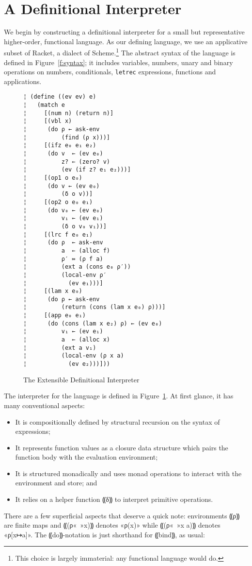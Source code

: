 \section{A Definitional Interpreter}\label{s:interp}

We begin by constructing a definitional interpreter for a small but
representative higher-order, functional language.  As our defining language, we
use an applicative subset of Racket, a dialect of Scheme.\footnote{This choice
is largely immaterial: any functional language would do.} The abstract syntax
of the language is defined in Figure~\ref{f:syntax}; it includes variables,
numbers, unary and binary operations on numbers, conditionals, {\tt letrec}
expressions, functions and applications.

\begin{figure}
\begin{lstlisting}
¦ (define ((ev ev) e)
¦   (match e
¦     [(num n) (return n)]
¦     [(vbl x)
¦      (do ρ ← ask-env
¦          (find (ρ x)))]    
¦     [(ifz e₀ e₁ e₂) 
¦      (do v  ← (ev e₀)
¦          z? ← (zero? v)
¦          (ev (if z? e₁ e₂)))]
¦     [(op1 o e₀)
¦      (do v ← (ev e₀)
¦          (δ o v))]   
¦     [(op2 o e₀ e₁)
¦      (do v₀ ← (ev e₀)
¦          v₁ ← (ev e₁)
¦          (δ o v₀ v₁))]
¦     [(lrc f e₀ e₁) 
¦      (do ρ  ← ask-env
¦          a  ← (alloc f)
¦          ρ′ ≔ (ρ f a)
¦          (ext a (cons e₀ ρ′))
¦          (local-env ρ′
¦            (ev e₁)))]
¦     [(lam x e₀)
¦      (do ρ ← ask-env
¦          (return (cons (lam x e₀) ρ)))]
¦     [(app e₀ e₁)
¦      (do (cons (lam x e₂) ρ) ← (ev e₀)
¦          v₁ ← (ev e₁)
¦          a  ← (alloc x)         
¦          (ext a v₁)
¦          (local-env (ρ x a) 
¦            (ev e₂)))]))
\end{lstlisting}
\caption{The Extensible Definitional Interpreter}
\label{f:interpreter}
\end{figure}

The interpreter for the language is defined in Figure~\ref{f:interpreter}. At
first glance, it has many conventional aspects:
\begin{itemize}
\item It is compositionally defined by structural recursion on the syntax of
expressions;
\item It represents function values as a closure data structure which pairs the
function body with the evaluation environment;
\item It is structured monadically and uses monad operations to interact with
the environment and store; and
\item It relies on a helper function ⸨δ⸩ to interpret primitive operations.
\end{itemize}
There are a few superficial aspects that deserve a quick note:
environments ⸨ρ⸩ are finite maps and ⸨(ρ«\ »x)⸩ denotes
«ρ(x)» while ⸨(ρ«\ »x a)⸩ denotes «ρ[x↦a]».  The
⸨do⸩-notation is just shorthand for ⸨bind⸩, as usual:

